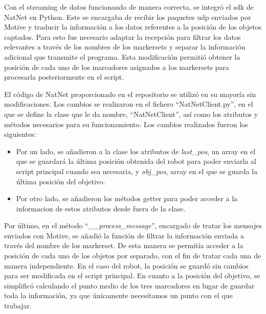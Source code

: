 Con el streaming de datos funcionando de manera correcta, se integró el \Gls{sdk} de NatNet en Python. Este se encargaba de recibir los paquetes \Gls{udp} enviados por Motive y traducir la información 
a los datos referentes a la posición de los objetos captados. Para esto fue necesario adaptar la recepción para filtrar los datos relevantes a través de los nombres de los \gls{markerset}s y separar la 
información adicional que transmite el programa. Esta modificación permitió obtener la posición de cada uno de los marcadores asignados a los \gls{markerset}s para procesarla posteriormente en 
el \gls{script}.

El código de NatNet proporcionado en el repositorio se utilizó en su mayoría sin modificaciones. Los cambios se realizaron en el fichero “NatNetClient.py”, en el que se define la 
clase que le da nombre, “NatNetClient”, así como los atributos y métodos necesarios para su funcionamiento. Los cambios realizados fueron los siguientes: 

\begin{itemize}
  
  \item Por un lado, se añadieron a la clase los atributos de \textit{last\_pos}, un array en el que se guardará la última posición obtenida del robot para poder enviarla al \gls{script} principal 
  cuando sea necesaria, y \textit{obj\_pos}, array en el que se guarda la última posición del objetivo.
  \item Por otro lado, se añadieron los métodos getter para poder acceder a la informacion de estos atributos desde fuera de la clase.

\end{itemize}

Por último, en el método “\textit{\_\_process\_message}”, encargado de tratar los mensajes enviados con Motive, se añadió la función de filtrar la información enviada a través del nombre de los 
\gls{markerset}. De esta manera se permitía acceder a la posición de cada uno de los objetos por separado, con el fin de tratar cada una de manera independiente. En el caso del robot, la 
posición se guardó sin cambios para ser modificada en el \gls{script} principal. En cuanto a la posición del objetivo, se simplificó calculando el punto medio de los tres marcadores en lugar de 
guardar toda la información, ya que únicamente necesitamos un punto con el que trabajar.

